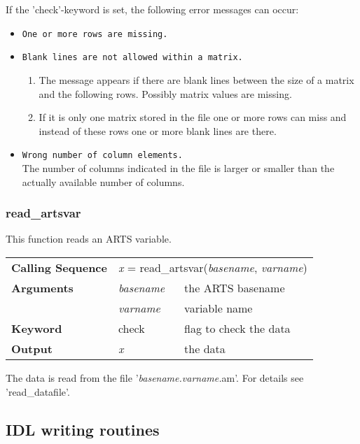 If the 'check'-keyword is set, the following error messages can occur:
\begin{itemize}
  \item \texttt{One or more rows are missing.}
  \item \texttt{Blank lines are not allowed within a matrix.}
        \begin{enumerate}
          \item The message appears if there are blank lines between
                the size of a matrix and the following rows. Possibly
                matrix values are missing.
          \item If it is only one matrix stored in the file one or
                more rows can miss and instead of these rows one or
                more blank lines are there.
        \end{enumerate}
  \item \texttt{Wrong number of column elements.} \\
        The number of columns indicated in the file is larger or
        smaller than the actually available number of columns.
\end{itemize}
\subsubsection{read\_artsvar}
This function reads an ARTS variable.
\begin{center}
\begin{tabular}{|l|ll|}
  \hline
  \textbf{Calling Sequence} &
  \multicolumn{2}{l|}{\textit{x} = %
  {\ttfamily read\_artsvar(\textnormal{\textit{basename}, %
                                       \textit{varname}})}}        \\
  \textbf{Arguments} & \textit{basename} & the ARTS basename       \\
                     & \textit{varname}  & variable name           \\
  \textbf{Keyword}   & check             & flag to check the data  \\
  \textbf{Output}    & \textit{x}        & the data                \\
  \hline
\end{tabular}
\end{center}
The data is read from the file '\textit{basename.varname.}am'. For
details see 'read\_datafile'.
\subsection{IDL writing routines} \label{writing}
